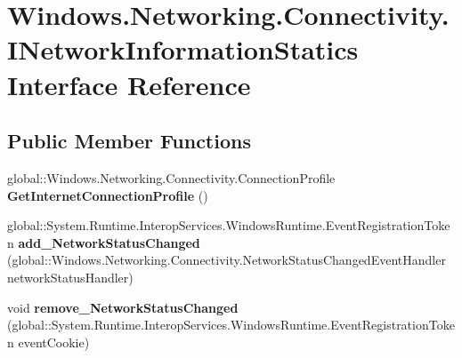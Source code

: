 \hypertarget{interface_windows_1_1_networking_1_1_connectivity_1_1_i_network_information_statics}{}\section{Windows.\+Networking.\+Connectivity.\+I\+Network\+Information\+Statics Interface Reference}
\label{interface_windows_1_1_networking_1_1_connectivity_1_1_i_network_information_statics}
\subsection*{Public Member Functions}
\begin{DoxyCompactItemize}
\item 
\mbox{\label{interface_windows_1_1_networking_1_1_connectivity_1_1_i_network_information_statics_ad3ef05f2aa0e8eba2f3ec17040f38ea0}} 
global\+::\+Windows.\+Networking.\+Connectivity.\+Connection\+Profile {\bfseries Get\+Internet\+Connection\+Profile} ()
\item 
\mbox{\label{interface_windows_1_1_networking_1_1_connectivity_1_1_i_network_information_statics_a4a3e3682f51b9045eb6cda230e158f1f}} 
global\+::\+System.\+Runtime.\+Interop\+Services.\+Windows\+Runtime.\+Event\+Registration\+Token {\bfseries add\+\_\+\+Network\+Status\+Changed} (global\+::\+Windows.\+Networking.\+Connectivity.\+Network\+Status\+Changed\+Event\+Handler network\+Status\+Handler)
\item 
\mbox{\label{interface_windows_1_1_networking_1_1_connectivity_1_1_i_network_information_statics_a02ae9ff4dce202e50a3853e7bf5adbaa}} 
void {\bfseries remove\+\_\+\+Network\+Status\+Changed} (global\+::\+System.\+Runtime.\+Interop\+Services.\+Windows\+Runtime.\+Event\+Registration\+Token event\+Cookie)
\item 
\mbox{\label{interface_windows_1_1_networking_1_1_connectivity_1_1_i_network_information_statics_ad3ef05f2aa0e8eba2f3ec17040f38ea0}} 

\end{DoxyCompactItemize}
